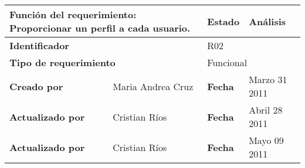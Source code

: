 %
\begin{center}
\begin{longtable}{|p{}|p{}|p{}|p{}|}
\hline
\multicolumn{2}{|p{0.45\textwidth}|}{{\bf {Función del requerimiento:}}
Proporcionar un perfil a cada usuario. } & {\bf{ Estado}} & Análisis \\
\hline
\multicolumn{2}{|p{0.45\textwidth}}{\bf Identificador} &
\multicolumn{2}{|p{0.45\textwidth}|}{R02} \\
\hline
\multicolumn{2}{|p{0.45\textwidth}}{\bf {Tipo de requerimiento}} &
\multicolumn{2}{|p{0.45\textwidth}|}{Funcional}\\
\hline
\bf {Creado por} & Maria Andrea Cruz & \bf {Fecha } & Marzo 31 2011 \\
\hline
\bf {Actualizado por} & Cristian Ríos & \bf {Fecha }& Abril 28 2011\\
\hline
\bf {Actualizado por} & Cristian Ríos & \bf {Fecha } & Mayo 09 2011\\



\end{longtable}
\end{center}
